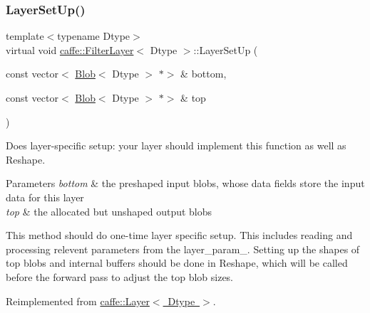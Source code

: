 \mbox{\label{classcaffe_1_1_filter_layer_a59443022ba473d248c63b5ab7a182826}} 
\subsubsection{\texorpdfstring{Layer\+Set\+Up()}{LayerSetUp()}\hspace{0.1cm}{\footnotesize\ttfamily [2/2]}}
{\footnotesize\ttfamily template$<$typename Dtype$>$ \\
virtual void \mbox{\hyperlink{classcaffe_1_1_filter_layer}{caffe\+::\+Filter\+Layer}}$<$ Dtype $>$\+::Layer\+Set\+Up (\begin{DoxyParamCaption}\item[{const vector$<$ \mbox{\hyperlink{classcaffe_1_1_blob}{Blob}}$<$ Dtype $>$ $\ast$$>$ \&}]{bottom,  }\item[{const vector$<$ \mbox{\hyperlink{classcaffe_1_1_blob}{Blob}}$<$ Dtype $>$ $\ast$$>$ \&}]{top }\end{DoxyParamCaption})\hspace{0.3cm}{\ttfamily [virtual]}}



Does layer-\/specific setup\+: your layer should implement this function as well as Reshape. 


\begin{DoxyParams}{Parameters}
{\em bottom} & the preshaped input blobs, whose data fields store the input data for this layer \\
\hline
{\em top} & the allocated but unshaped output blobs\\
\hline
\end{DoxyParams}
This method should do one-\/time layer specific setup. This includes reading and processing relevent parameters from the {\ttfamily layer\+\_\+param\+\_\+}. Setting up the shapes of top blobs and internal buffers should be done in {\ttfamily Reshape}, which will be called before the forward pass to adjust the top blob sizes. 

Reimplemented from \mbox{\hyperlink{classcaffe_1_1_layer_a481323a3e0972c682787f2137468c29f}{caffe\+::\+Layer$<$ Dtype $>$}}.

\mbox{\label{classcaffe_1_1_filter_layer_af4c97961e859653ef0fa21d796af0259}} 
